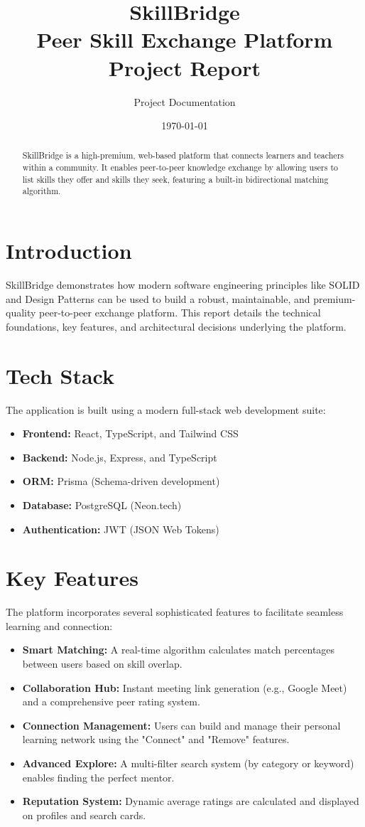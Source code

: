 \documentclass[12pt,a4paper]{article}
\title{SkillBridge\\ \large Peer Skill Exchange Platform Project Report}
\author{Project Documentation}
\date{\today}
\begin{document}
\maketitle

\begin{abstract}
SkillBridge is a high-premium, web-based platform that connects learners and teachers within a community. It enables peer-to-peer knowledge exchange by allowing users to list skills they offer and skills they seek, featuring a built-in bidirectional matching algorithm.
\end{abstract}

\section{Introduction}
SkillBridge demonstrates how modern software engineering principles like SOLID and Design Patterns can be used to build a robust, maintainable, and premium-quality peer-to-peer exchange platform. This report details the technical foundations, key features, and architectural decisions underlying the platform.

\section{Tech Stack}
The application is built using a modern full-stack web development suite:
\begin{itemize}
    \item \textbf{Frontend:} React, TypeScript, and Tailwind CSS
    \item \textbf{Backend:} Node.js, Express, and TypeScript
    \item \textbf{ORM:} Prisma (Schema-driven development)
    \item \textbf{Database:} PostgreSQL (Neon.tech)
    \item \textbf{Authentication:} JWT (JSON Web Tokens)
\end{itemize}

\section{Key Features}
The platform incorporates several sophisticated features to facilitate seamless learning and connection:
\begin{itemize}
    \item \textbf{Smart Matching:} A real-time algorithm calculates match percentages between users based on skill overlap.
    \item \textbf{Collaboration Hub:} Instant meeting link generation (e.g., Google Meet) and a comprehensive peer rating system.
    \item \textbf{Connection Management:} Users can build and manage their personal learning network using the "Connect" and "Remove" features.
    \item \textbf{Advanced Explore:} A multi-filter search system (by category or keyword) enables finding the perfect mentor.
    \item \textbf{Reputation System:} Dynamic average ratings are calculated and displayed on profiles and search cards.
\end{itemize}
\end{document}
